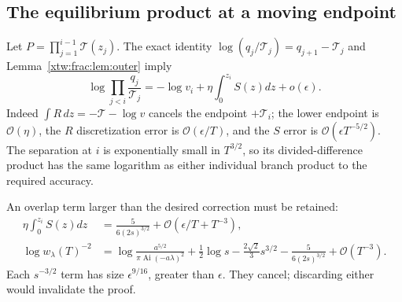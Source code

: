 \documentclass[11pt]{article}
\theoremstyle{remark}\newtheorem{remark}[theorem]{Remark}
\newcommand{\OO}{\mathcal O}
\newcommand{\Ai}{\operatorname{Ai}}
\newcommand{\TT}{\mathcal T}
\begin{document}
\subsection{The equilibrium product at a moving endpoint}
Let $P=\prod_{j=1}^{i-1}\TT(z_j)$. The exact identity
$\log(q_j/\TT_j)=q_{j+1}-\TT_j$ and Lemma~\ref{xtw:frac:lem:outer} imply
\begin{equation}\label{xtw:frac:eq:ratioproduct}
 \log\prod_{j<i}\frac{q_j}{\TT_j}
   =-\log v_i+\eta\int_0^{z_i}S(z)dz+o(\epsilon).
\end{equation}
Indeed $\int R\,dz=-\TT-\log v$ cancels the endpoint $+\TT_i$;
the lower endpoint is $\OO(\eta)$, the $R$ discretization error is
$\OO(\epsilon/T)$, and the $S$ error is
$\OO(\epsilon T^{-5/2})$. The separation at $i$ is exponentially small
in $T^{3/2}$, so its divided-difference product has the same logarithm as
either individual branch product to the required accuracy.

An overlap term larger than the desired correction must be retained:
\begin{align}
 \eta\int_0^{z_i}S(z)dz
   &=\frac5{6(2s)^{3/2}}+\OO(\epsilon/T+T^{-3}),\label{xtw:frac:eq:Soverlap}\\
 \log w_\lambda(T)^{-2}
   &=\log\frac{a^{5/2}}{\pi\Ai(-a\lambda)^2}
       +\tfrac12\log s-\frac{2\sqrt2}{3}s^{3/2}
       -\frac5{6(2s)^{3/2}}+\OO(T^{-3}).\label{xtw:frac:eq:woverlap}
\end{align}
Each $s^{-3/2}$ term has size $\epsilon^{9/16}$, greater than
$\epsilon$. They cancel; discarding either would invalidate the proof.
\end{document}
